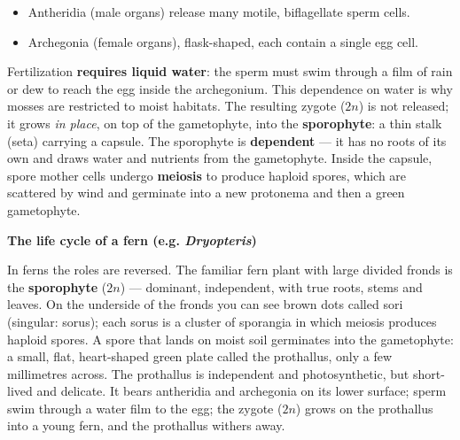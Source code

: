 \documentclass[11pt]{article}
\newcommand{\cle}[1]{{\popxbold\color{popdark}#1}}
\begin{document}
\begin{itemize}
\item \cle{Antheridia} (male organs) release many motile, biflagellate sperm cells.
\item \cle{Archegonia} (female organs), flask-shaped, each contain a single egg cell.
\end{itemize}

Fertilization \textbf{requires liquid water}: the sperm must swim through a film of rain or dew to reach the egg inside the archegonium. This dependence on water is why mosses are restricted to moist habitats. The resulting zygote ($2n$) is not released; it grows \emph{in place}, on top of the gametophyte, into the \textbf{sporophyte}: a thin stalk (seta) carrying a capsule. The sporophyte is \textbf{dependent} — it has no roots of its own and draws water and nutrients from the gametophyte. Inside the capsule, spore mother cells undergo \textbf{meiosis} to produce haploid spores, which are scattered by wind and germinate into a new protonema and then a green gametophyte.

\textbf{The life cycle of a fern (e.g. \emph{Dryopteris})}\par
In ferns the roles are reversed. The familiar fern plant with large divided fronds is the \textbf{sporophyte} ($2n$) — dominant, independent, with true roots, stems and leaves. On the underside of the fronds you can see brown dots called \cle{sori} (singular: sorus); each sorus is a cluster of \cle{sporangia} in which meiosis produces haploid \cle{spores}. A spore that lands on moist soil germinates into the gametophyte: a small, flat, heart-shaped green plate called the \cle{prothallus}, only a few millimetres across. The prothallus is independent and photosynthetic, but short-lived and delicate. It bears antheridia and archegonia on its lower surface; sperm swim through a water film to the egg; the zygote ($2n$) grows on the prothallus into a young fern, and the prothallus withers away.
\end{document}

